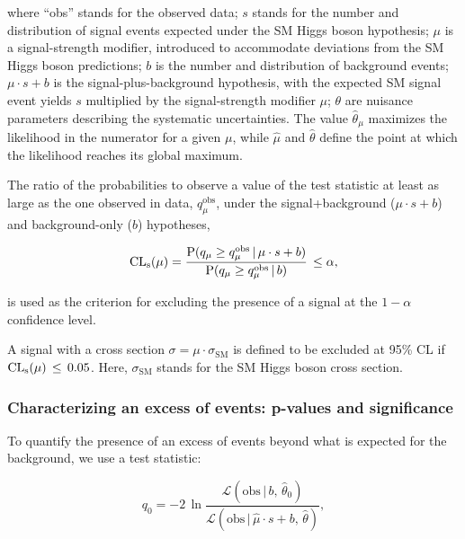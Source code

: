 \documentclass[12pt,twoside,a4paper,cmspaper,final,collab]{cms-tdr}
\begin{document}
where ``obs'' stands for the observed data;
$s$ stands for the number and distribution of signal events expected under the SM Higgs boson hypothesis;
$\mu$ is a signal-strength modifier,
introduced to accommodate deviations from the SM Higgs boson predictions;
$b$ is the number and distribution of background events;
$\mu \cdot s + b$ is the signal-plus-background hypothesis,
with the expected SM signal event yields $s$
multiplied by the signal-strength modifier $\mu$;
$\theta$ are nuisance parameters describing the systematic uncertainties.
The value $\hat \theta_{\mu}$ maximizes the likelihood in the numerator for a given $\mu$,
while $\hat \mu$ and $\hat \theta$ define the point at which the likelihood reaches its global maximum.


The ratio of the probabilities to observe a value of the test statistic
at least as large as the one observed in data, $q_{\mu}^{\mathrm{obs}}$,
under the signal+background ($\mu \cdot s + b$) and background-only ($b$) hypotheses,


\begin{equation}
\mathrm{CL_s} (\mu) = \frac {\mathrm{P}(q_{\mu} \geq q_{\mu}^{\mathrm{obs}} \, | \, \mu \cdot s+b)}
             {\mathrm{P}(q_{\mu} \geq q_{\mu}^{\mathrm{obs}} \, | \, b )} \, \leq \alpha ,
\end{equation}

is used as the criterion for excluding the presence of a signal at the $1 - \alpha$ confidence level.

A signal with a cross section $\sigma = \mu \cdot
\sigma_{\mathrm{SM}}$ is defined to be excluded at 95\% CL
if $\mathrm{CL_s} (\mu)\, \leq \, 0.05$. Here, $\sigma_{\mathrm{SM}}$ stands for the SM Higgs boson cross section.



\subsubsection{Characterizing an excess of events: p-values and significance}


To quantify the presence of an excess of events beyond what is expected for the background,
we use a test statistic:


\begin{equation}
\label{eq:method_q0}
 q_{0} = - 2 \, \ln \frac {\mathcal{L}(\mathrm{obs} \, | \, b, \, \hat \theta_{0} ) }
                       {\mathcal{L}(\mathrm{obs} \, | \, \hat \mu \cdot s + b, \, \hat \theta ) } ,
\end{equation}
\end{document}
